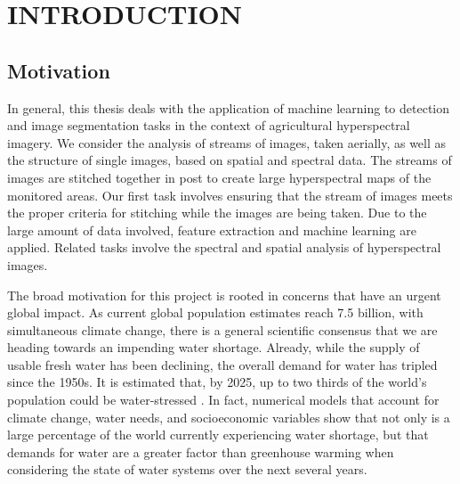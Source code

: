 %
%
%



\pagestyle{plain} %
\setcounter{page}{1}


\chapter{\uppercase {Introduction}}

\section{Motivation}

In general, this thesis deals with the application of machine learning to detection and image segmentation tasks in the context of agricultural hyperspectral imagery.
We consider the analysis of streams of images, taken aerially, as well as the structure of single images, based on spatial and spectral data.
The streams of images are stitched together in post to create large hyperspectral maps of the monitored areas.
Our first task involves ensuring that the stream of images meets the proper criteria for stitching while the images are being taken.
Due to the large amount of data involved, feature extraction and machine learning are applied.
Related tasks involve the spectral and spatial analysis of hyperspectral images.

The broad motivation for this project is rooted in concerns that have an urgent global impact.
As current global population estimates reach 7.5 billion, with simultaneous climate change, there is a general scientific consensus that we are heading towards an impending water shortage.
Already, while the supply of usable fresh water has been declining, the overall demand for water has tripled since the 1950s.
It is estimated that, by 2025, up to two thirds of the world's population could be water-stressed \cite{waterresources}.
In fact, numerical models that account for climate change, water needs, and socioeconomic variables show that not only is a large percentage of the world currently experiencing water shortage, but that demands for water are a greater factor than greenhouse warming when considering the state of water systems over the next several years.

